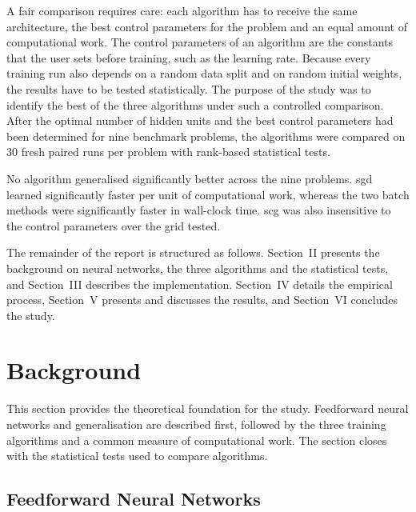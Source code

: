 \documentclass[conference]{IEEEtran}
\begin{document}
A fair comparison requires care: each algorithm has to receive the same
architecture, the best control parameters for the problem and an equal amount of
computational work. The control parameters of an algorithm are the constants that
the user sets before training, such as the learning rate. Because every training
run also depends on a random data split and on random initial weights, the results
have to be tested statistically. The purpose of the study was to identify the best
of the three algorithms under such a controlled comparison. After the optimal number of hidden
units and the best control parameters had been determined for nine benchmark
problems, the algorithms were compared on 30 fresh paired runs per problem with
rank-based statistical tests.

No algorithm generalised significantly better across the nine problems. \Gls{sgd}
learned significantly faster per unit of computational work, whereas the two batch
methods were significantly faster in wall-clock time. \Gls{scg} was also
insensitive to the control parameters over the grid tested.

The remainder of the report is structured as follows. Section~II presents the
background on neural networks, the three algorithms and the statistical tests,
and Section~III describes the implementation. Section~IV details the empirical
process, Section~V presents and discusses the results, and Section~VI concludes
the study.

\section{Background}

This section provides the theoretical foundation for the study. Feedforward
neural networks and generalisation are described first, followed by the three
training algorithms and a common measure of computational work. The
section closes with the statistical tests used to compare algorithms.

\subsection{Feedforward Neural Networks}
\end{document}
